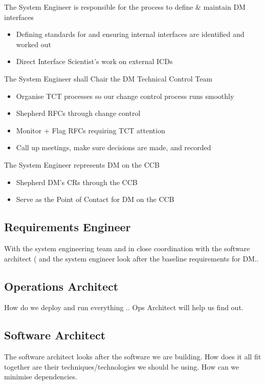 The System Engineer is responsible for the process to define \& maintain DM interfaces
\begin{itemize}
\item Defining standards for and ensuring internal interfaces are identified and worked out
\item Direct Interface Scientist's work on external ICDs
\end{itemize}

The System Engineer shall Chair the DM Technical Control Team 
\begin{itemize}
\item Organise TCT processes so our change control process runs smoothly
\item Shepherd RFCs through change control
\item Monitor + Flag RFCs requiring TCT attention
\item Call up meetings, make sure decisions are made, and recorded
\end{itemize}

The System Engineer represents DM on the CCB
\begin{itemize}
\item Shepherd DM’s CRs through the CCB
\item Serve as the Point of Contact for DM on the CCB
\end{itemize}

\subsection{Requirements Engineer \label{role:reqeng }}
With the system engineering team  and in close coordination with the software architect ( and the system engineer  look after the baseline requirements for DM.. 


\subsection{Operations Architect \label{role:optarc }}
How do we deploy and run everything .. Ops Architect will help us find out. 


\subsection{Software Architect \label{role:softarc }}
The software architect looks after the software we are building. How does it all fit together are their techniques/technologies we should be using. How can we minimise dependencies. 


